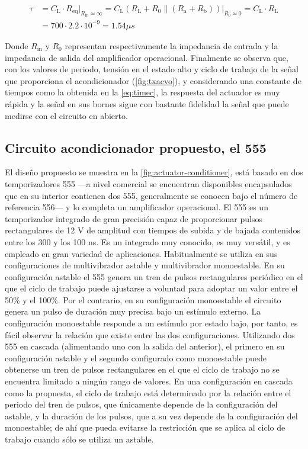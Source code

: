 \begin{equation}\label{eq:timec}
	\begin{split}
		\tau &= C_\text{L}\cdot R_\text{eq}
		\Big|_{R_\text{in}\simeq\infty} =
		C_\text{L}\left(R_\text{L} + R_0\|(R_\text{a} +
		R_\text{b})\right)\Big|_{R_0 \simeq 0} =
		C_\text{L}\cdot R_\text{L} \\
		&= 700\cdot2.2\cdot 10^{-9} = 1.54\mu s
	\end{split}
\end{equation}

Donde $R_\text{in}$ y $R_\text{0}$ representan respectivamente la
impedancia de entrada y la impedancia de salida del amplificador
operacional. Finalmente se observa que, con los valores de periodo, tensión
en el estado alto y ciclo de trabajo de la señal que proporciona el
acondicionador (\cref{fig:txacvo}), y considerando una constante de tiempos
como la obtenida en la \cref{eq:timec}, la respuesta del actuador es muy
rápida y la señal en sus bornes sigue con bastante fidelidad la señal que
puede medirse con el circuito en abierto.


\subsection[Circuito acondicionador propuesto]{Circuito acondicionador
propuesto, el 555}

El diseño propuesto se muestra en la \cref{fig:actuator-conditioner}, está
basado en dos temporizadores 555 ---a nivel comercial se encuentran
disponibles encapsulados que en su interior contienen dos 555, generalmente
se conocen bajo el número de referencia 556--- y lo completa un
amplificador operacional. El 555 es un temporizador integrado de gran
precisión capaz de proporcionar pulsos rectangulares de 12 V de amplitud
con tiempos de subida y de bajada contenidos entre los 300 y los 100 ns. Es
un integrado muy conocido, es muy versátil, y es empleado en gran variedad
de aplicaciones. Habitualmente se utiliza en sus configuraciones de
multivibrador astable y multivibrador monoestable. En su configuración
astable el 555 genera un tren de pulsos rectangulares periódico en el que
el ciclo de trabajo puede ajustarse a voluntad para adoptar un valor entre
el 50\% y el 100\%. Por el contrario, en su configuración monoestable el
circuito genera un pulso de duración muy precisa bajo un estímulo externo.
La configuración monoestable responde a un estímulo por estado bajo, por
tanto, es fácil observar la relación que existe entre las dos
configuraciones. Utilizando dos 555 en cascada (alimentando uno con la
salida del anterior), el primero en su configuración astable y el segundo
configurado como monoestable puede obtenerse un tren de pulsos
rectangulares en el que el ciclo de trabajo no se encuentra limitado a
ningún rango de valores. En una configuración en cascada como la propuesta,
el ciclo de trabajo está determinado por la relación entre el periodo del
tren de pulsos, que únicamente depende de la configuración del astable, y
la duración de los pulsos, que a su vez depende de la configuración del
monoestable; de ahí que pueda evitarse la restricción que se aplica al
ciclo de trabajo cuando sólo se utiliza un astable.

